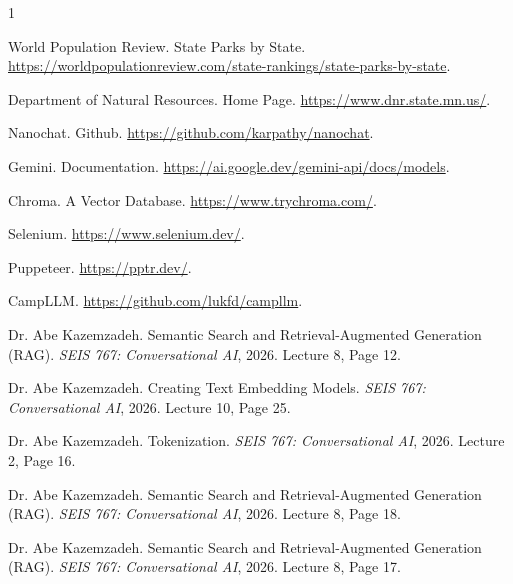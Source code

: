 \documentclass[11pt]{article}
\begin{document}
% 
\begin{thebibliography}{1}

World Population Review.
\newblock State Parks by State.
\newblock \href{https://worldpopulationreview.com/state-rankings/state-parks-by-state}{https://worldpopulationreview.com/state-rankings/state-parks-by-state}.

Department of Natural Resources.
\newblock Home Page.
\newblock \href{https://www.dnr.state.mn.us/}{https://www.dnr.state.mn.us/}.

Nanochat.
\newblock Github.
\newblock \href{https://github.com/karpathy/nanochat}{https://github.com/karpathy/nanochat}.

Gemini.
\newblock Documentation.
\newblock \href{https://ai.google.dev/gemini-api/docs/models}{https://ai.google.dev/gemini-api/docs/models}.

Chroma. A Vector Database.
\newblock \href{https://www.trychroma.com/}{https://www.trychroma.com/}.

Selenium.
\newblock \href{https://www.selenium.dev/}{https://www.selenium.dev/}.

Puppeteer.
\newblock \href{https://pptr.dev/}{https://pptr.dev/}.

CampLLM.
\newblock \href{https://github.com/lukfd/campllm}{https://github.com/lukfd/campllm}.

Dr. Abe Kazemzadeh.
\newblock Semantic Search and Retrieval-Augmented Generation (RAG).
\newblock \emph{SEIS 767: Conversational AI}, 2026.
\newblock Lecture 8, Page 12.

Dr. Abe Kazemzadeh.
\newblock Creating Text Embedding Models.
\newblock \emph{SEIS 767: Conversational AI}, 2026.
\newblock Lecture 10, Page 25.

Dr. Abe Kazemzadeh.
\newblock Tokenization.
\newblock \emph{SEIS 767: Conversational AI}, 2026.
\newblock Lecture 2, Page 16.

Dr. Abe Kazemzadeh.
\newblock Semantic Search and Retrieval-Augmented Generation (RAG).
\newblock \emph{SEIS 767: Conversational AI}, 2026.
\newblock Lecture 8, Page 18.

Dr. Abe Kazemzadeh.
\newblock Semantic Search and Retrieval-Augmented Generation (RAG).
\newblock \emph{SEIS 767: Conversational AI}, 2026.
\newblock Lecture 8, Page 17.


\end{thebibliography}
\end{document}

